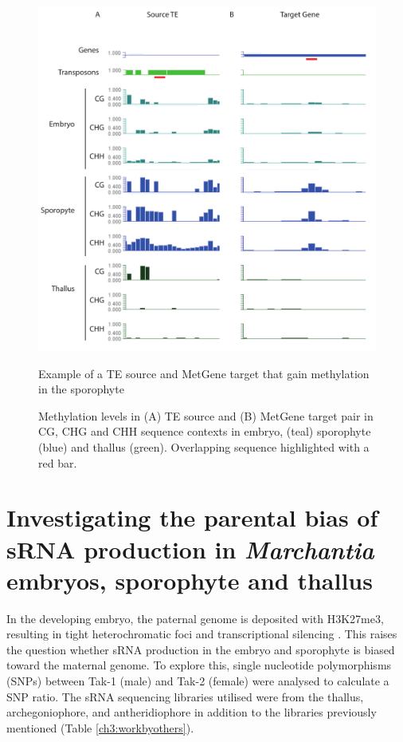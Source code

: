 \begin{figure}[htbp!] 
\centering    
    \includegraphics[width=1\textwidth]{Chapter3/Figs/Figure6_pairs_examples.pdf}
\caption{Example of a TE  source and MetGene target that gain methylation in the sporophyte}
\label{fig:TE_SLM_pairs}
\captionsetup{font=small}
    \caption*{Methylation levels in (A) TE source and (B) MetGene target pair in CG, CHG and CHH sequence contexts in embryo, (teal) sporophyte (blue) and thallus (green). Overlapping sequence highlighted with a red bar.}
\end{figure}

\section{Investigating the parental bias of sRNA production in \textit{Marchantia} embryos, sporophyte and thallus}

In the developing embryo, the paternal genome is deposited with H3K27me3, resulting in tight heterochromatic foci and transcriptional silencing \cite{RN160}. This raises the question whether sRNA production in the embryo and sporophyte is biased toward the maternal genome. To explore this, single nucleotide polymorphisms (SNPs) between Tak-1 (male) and Tak-2 (female) were analysed to calculate a SNP ratio. The sRNA sequencing libraries utilised were from the thallus, archegoniophore, and antheridiophore \cite{RN265} in addition to the libraries previously mentioned (Table \ref{ch3:workbyothers}).

